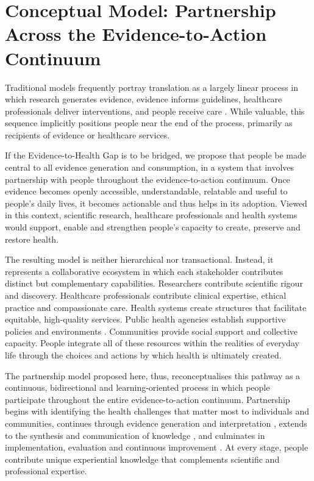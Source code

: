 \documentclass{article}
\begin{document}
\section{Conceptual Model: Partnership Across the Evidence-to-Action Continuum}
\label{sec:org1769a1d}

Traditional models frequently portray translation as a largely linear process in which research generates evidence, evidence informs guidelines, healthcare professionals deliver interventions, and people receive care \cite{Sackett1996} \cite{Straus2013} \cite{Eccles2006}. While valuable, this sequence implicitly positions people near the end of the process, primarily as recipients of evidence or healthcare services.

If the Evidence-to-Health Gap is to be bridged, we propose that people be made central to  all evidence generation and consumption, in a system that involves partnership with people throughout the evidence-to-action continuum. Once evidence becomes openly accessible, understandable, relatable and useful to people's daily lives, it becomes actionable and thus helps in its adoption. Viewed in this context, scientific research, healthcare professionals and health systems would support, enable and strengthen people's capacity to create, preserve and restore health.

The resulting model is neither hierarchical nor transactional. Instead, it represents a collaborative ecosystem in which each stakeholder contributes distinct but complementary capabilities. Researchers contribute scientific rigour and discovery. Healthcare professionals contribute clinical expertise, ethical practice and compassionate care. Health systems create structures that facilitate equitable, high-quality services. Public health agencies establish supportive policies and environments \cite{WHO1986}. Communities provide social support \cite{Marmot2012} and collective capacity. People integrate all of these resources within the realities of everyday life through the choices and actions by which health is ultimately created.

The partnership model proposed here, thus, reconceptualises this pathway as a continuous, bidirectional and learning-oriented process in which people participate throughout the entire evidence-to-action continuum. Partnership begins with identifying the health challenges that matter most to individuals and communities, continues through evidence generation and interpretation \cite{Straus2013}, extends to the synthesis and communication of knowledge \cite{Greenhalgh2011}, and culminates in implementation, evaluation and continuous improvement \cite{Eccles2006} \cite{IOM2013}. At every stage, people contribute unique experiential knowledge that complements scientific and professional expertise.
\end{document}
